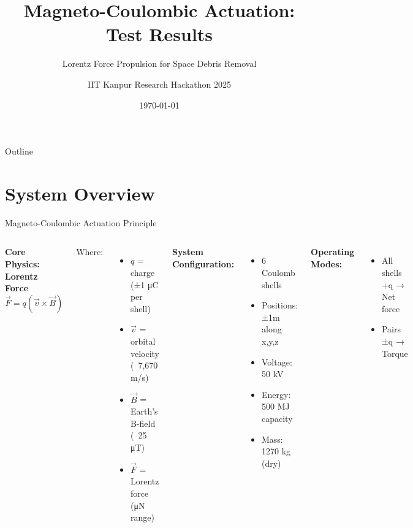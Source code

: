 \documentclass[aspectratio=169]{beamer}
\title{Magneto-Coulombic Actuation: Test Results}
\subtitle{Lorentz Force Propulsion for Space Debris Removal}
\author{IIT Kanpur Research Hackathon 2025}
\date{\today}
\begin{document}
\begin{frame}
\titlepage
\end{frame}

\begin{frame}{Outline}
\tableofcontents
\end{frame}

\section{System Overview}

\begin{frame}{Magneto-Coulombic Actuation Principle}
\begin{columns}
\textbf{Core Physics: Lorentz Force}
\begin{equation}
\vec{F} = q(\vec{v} \times \vec{B})
\end{equation}

Where:
\begin{itemize}
    \item $q$ = charge (±1 μC per shell)
    \item $\vec{v}$ = orbital velocity (~7,670 m/s)
    \item $\vec{B}$ = Earth's B-field (~25 μT)
    \item $\vec{F}$ = Lorentz force (μN range)
\end{itemize}

\textbf{System Configuration:}
\begin{itemize}
    \item 6 Coulomb shells
    \item Positions: ±1m along x,y,z
    \item Voltage: 50 kV
    \item Energy: 500 MJ capacity
    \item Mass: 1270 kg (dry)
\end{itemize}

\vspace{1em}
\textbf{Operating Modes:}
\begin{itemize}
    \item All shells +q → Net force
    \item Pairs ±q → Torque
\end{itemize}
\end{columns}
\end{frame}
\end{document}

